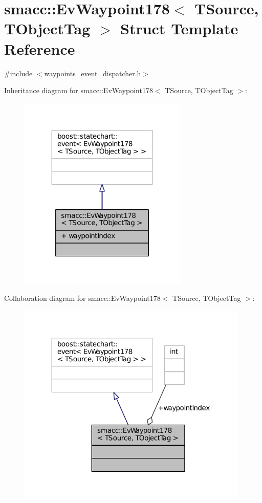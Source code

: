 \hypertarget{structsmacc_1_1EvWaypoint178}{}\section{smacc\+:\+:Ev\+Waypoint178$<$ T\+Source, T\+Object\+Tag $>$ Struct Template Reference}
\label{structsmacc_1_1EvWaypoint178}


{\ttfamily \#include $<$waypoints\+\_\+event\+\_\+dispatcher.\+h$>$}



Inheritance diagram for smacc\+:\+:Ev\+Waypoint178$<$ T\+Source, T\+Object\+Tag $>$\+:
\nopagebreak
\begin{figure}[H]
\begin{center}
\leavevmode
\includegraphics[width=227pt]{structsmacc_1_1EvWaypoint178__inherit__graph}
\end{center}
\end{figure}


Collaboration diagram for smacc\+:\+:Ev\+Waypoint178$<$ T\+Source, T\+Object\+Tag $>$\+:
\nopagebreak
\begin{figure}[H]
\begin{center}
\leavevmode
\includegraphics[width=312pt]{structsmacc_1_1EvWaypoint178__coll__graph}
\end{center}
\end{figure}
